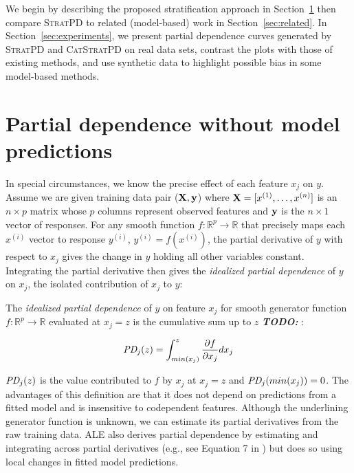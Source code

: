 \documentclass{article}
\newcommand{\secref}[1]{Section~\ref{#1}}
\newcommand{\todo}[1]{{\bf\em TODO:} {{\color{red}{#1}}}}
\newcommand{\spd}{\fontfamily{cmr}\textsc{\small StratPD}}
\newcommand{\cspd}{\fontfamily{cmr}\textsc{\small CatStratPD}}
\renewcommand{\xi}{x^{(i)}}
\begin{document}
We begin by describing the proposed stratification approach in \secref{sec:stratpd} then compare \spd{} to related (model-based) work in \secref{sec:related}. In \secref{sec:experiments}, we present partial dependence curves generated by \spd{} and \cspd{} on real data sets, contrast the plots with those of existing methods, and use synthetic data to highlight possible bias in some model-based methods.

\section{Partial dependence without model predictions}\label{sec:stratpd}

In special circumstances, we know the precise effect of each feature $x_j$ on $y$.  Assume we are given training data pair ($\bf X, y$) where ${\bf X} = [x^{(1)}, \ldots, x^{(n)}]$ is an $n \times p$ matrix whose $p$ columns represent observed features and ${\bf y}$ is the $n \times 1$ vector of responses. For any smooth function $f:\mathbb{R}^{p} \rightarrow \mathbb{R}$ that precisely maps each $\xi$ vector to response $y^{(i)}$, ${y^{(i)}} = f(\xi)$, the partial derivative of $y$ with respect to $x_j$ gives the change in $y$ holding all other variables constant.  Integrating the partial derivative then gives the {\em idealized partial dependence}  of $y$ on $x_j$, the isolated contribution of $x_j$ to $y$:

 The {\em idealized partial dependence} of $y$ on feature $x_j$ for smooth generator function $f:\mathbb{R}^{p} \rightarrow \mathbb{R}$ evaluated at $x_j = z$ is the cumulative sum up to $z$ \todo{do we need to say that the partial derivative is continuous also?}:

\begin{equation}\label{eq:pd}
\text{\it PD}_j(z) = \int_{min(x_j)}^z \frac{\partial f}{\partial x_j} dx_j
\end{equation}

$\text{\it PD}_j(z)$ is the value contributed to $f$ by $x_j$ at $x_j = z$ and $\text{\it PD}_j(min(x_j))=0$. The advantages of this definition are that it does not depend on predictions from a fitted model and is insensitive to codependent features.  Although the underlining generator function is unknown, we can estimate its partial derivatives from the raw training data. ALE also derives partial dependence by estimating and integrating across partial derivatives (e.g., see Equation 7 in \cite{ALE}) but does so using local changes in fitted model predictions.
\end{document}
